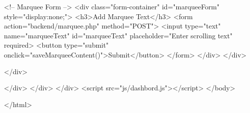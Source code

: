                 <!-- Marquee Form -->
                <div class="form-container" id="marqueeForm" style="display:none;">
                    <h3>Add Marquee Text</h3>
                    <form action="backend/marquee.php" method="POST">
                        <input type="text" name="marqueeText" id="marqueeText" placeholder="Enter scrolling text" required>
                        <button type="submit" onclick="saveMarqueeContent()">Submit</button>
                    </form>
                </div>
            </div>




        </div>


    </div>
    </div>
    </div>
    <script src="js/dashbord.js"></script>
</body>

</html>